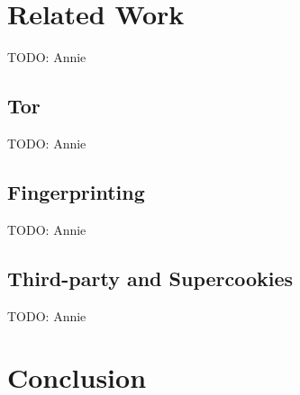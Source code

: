 \documentclass[12pt, letterpaper]{article}
\begin{document}
\section{Related Work}
TODO: Annie

\subsection{Tor}
TODO: Annie

\subsection{Fingerprinting}
TODO: Annie

\subsection{Third-party and Supercookies}
TODO: Annie

\section{Conclusion}


\end{document}
